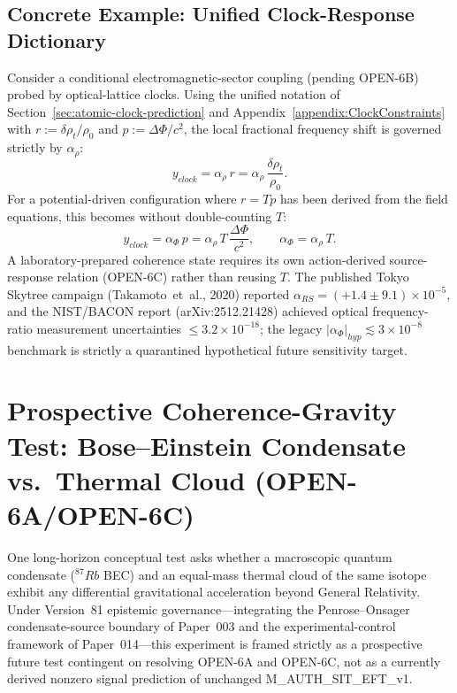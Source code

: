 \documentclass[american,11pt,letterpaper]{article}
\def\mathcal#1{#1}%
\def\mathrm#1{#1}%
\def\texttt#1{#1}%
\def\emph#1{#1}%
\begin{document}
\subsection{Concrete Example: Unified Clock-Response Dictionary}

Consider a conditional electromagnetic-sector coupling (pending \texttt{OPEN-6B}) probed by optical-lattice clocks. Using the unified notation of Section~\ref{sec:atomic-clock-prediction} and Appendix~\ref{appendix:ClockConstraints} with $r := \delta\rho_t/\rho_0$ and $p := \Delta\Phi/c^2$, the local fractional frequency shift is governed strictly by $\alpha_\rho$:
\[
y_{\mathrm{clock}} = \alpha_\rho\,r = \alpha_\rho\,\frac{\delta\rho_t}{\rho_0}.
\]
For a potential-driven configuration where $r = \mathcal{T} p$ has been derived from the field equations, this becomes without double-counting $\mathcal{T}$:
\[
y_{\mathrm{clock}} = \alpha_\Phi\,p = \alpha_\rho\,\mathcal{T}\,\frac{\Delta\Phi}{c^2},
\qquad
\alpha_\Phi = \alpha_\rho\,\mathcal{T}.
\]
A laboratory-prepared coherence state requires its own action-derived source-response relation (\texttt{OPEN-6C}) rather than reusing $\mathcal{T}$. The published Tokyo Skytree campaign (Takamoto~\emph{et~al.}, 2020) reported $\alpha_{\mathrm{RS}} = (+1.4 \pm 9.1)\times 10^{-5}$, and the NIST/BACON report (\texttt{arXiv:2512.21428}) achieved optical frequency-ratio measurement uncertainties $\le 3.2\times 10^{-18}$; the legacy $|\alpha_\Phi|_{\mathrm{hyp}} \lesssim 3 \times 10^{-8}$ benchmark is strictly a quarantined hypothetical future sensitivity target.

\section{Prospective Coherence-Gravity Test: Bose--Einstein Condensate vs.\ Thermal Cloud (\texttt{OPEN-6A}/\texttt{OPEN-6C})}
\label{sec:smoking-gun-bec}
\label{sec:bec_smoking_gun}

One long-horizon conceptual test asks whether a macroscopic quantum condensate ($^{87}\mathrm{Rb}$ BEC) and an equal-mass thermal cloud of the same isotope exhibit any differential gravitational acceleration beyond General Relativity. Under Version~81 epistemic governance---integrating the Penrose--Onsager condensate-source boundary of Paper~003 and the experimental-control framework of Paper~014---this experiment is framed strictly as a \emph{prospective future test contingent on resolving \texttt{OPEN-6A} and \texttt{OPEN-6C}}, not as a currently derived nonzero signal prediction of unchanged \texttt{M\_AUTH\_SIT\_EFT\_v1}.
\end{document}
